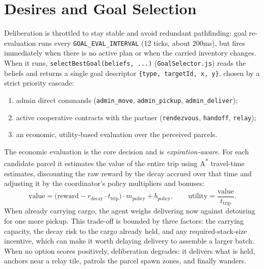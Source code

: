 \section{Desires and Goal Selection}
\label{sec:desires-goals}
Deliberation is throttled to stay stable and avoid redundant pathfinding: goal
re-evaluation runs every \texttt{GOAL\_EVAL\_INTERVAL} (12 ticks, about 200ms), but
fires immediately when there is no active plan or when the carried inventory
changes. When it runs, \texttt{selectBestGoal(beliefs, ...)}
(\texttt{GoalSelector.js}) reads the beliefs and returns a single goal descriptor
\texttt{\{type, targetId, x, y\}}, chosen by a strict priority cascade:

\begin{enumerate}
  \item admin direct commands (\texttt{admin\_move},
        \texttt{admin\_pickup}, \texttt{admin\_deliver});
  \item active cooperative contracts with the partner
        (\texttt{rendezvous}, \texttt{handoff}, \texttt{relay});
  \item an economic, utility-based evaluation over the perceived parcels.
\end{enumerate}

The economic evaluation is the core decision and is \emph{expiration-aware}. For
each candidate parcel it estimates the value of the entire trip using A\textsuperscript{*}
travel-time estimates, discounting the raw reward by the decay accrued over that
time and adjusting it by the coordinator's policy multipliers and bonuses:
%
\begin{equation}
  \mathrm{value} = \bigl(\mathrm{reward} - r_{\text{decay}}\cdot t_{\text{trip}}\bigr)
                   \cdot m_{\text{policy}} + b_{\text{policy}}, \qquad
  \mathrm{utility} = \frac{\mathrm{value}}{t_{\text{trip}}}.
\end{equation}
%
When already carrying cargo, the agent weighs delivering now against detouring
for one more pickup. This trade-off is bounded by three factors: the carrying capacity,
the decay risk to the cargo already held, and any required-stack-size incentive, which
can make it worth delaying delivery to assemble a larger batch. When no option scores
positively, deliberation degrades: it delivers what is held, anchors near a
relay tile, patrols the parcel spawn zones, and finally wanders.

